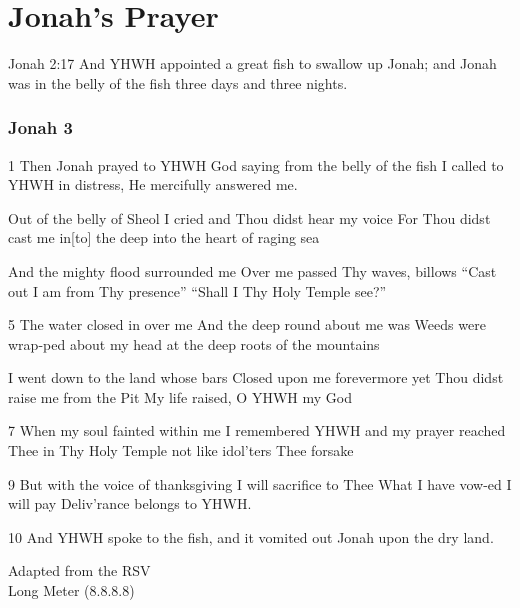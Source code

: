 \documentclass{article}
\begin{document}
\section*{Jonah's Prayer}

Jonah 2:17 And YHWH appointed a great fish to swallow up Jonah; and Jonah was in the belly of the fish three days and three nights.

\subsubsection*{Jonah 3}

1 Then Jonah prayed to YHWH God\newline
saying from the belly of the fish I called to YHWH in distress,\newline
He mercifully answered me.\newline

Out of the belly of Sheol\newline
I cried and Thou didst hear my voice For Thou didst cast me in[to] the deep\newline
into the heart of raging sea\newline

And the mighty flood surrounded me\newline
Over me passed Thy waves, billows  ``Cast out I am from Thy presence''\newline
``Shall I Thy Holy Temple see?''\newline

5 The water closed in over me\newline
And the deep round about me was\newline
Weeds were wrap-ped about my head at the deep roots of the mountains\newline

I went down to the land whose bars\newline
Closed upon me forevermore\newline
yet Thou didst raise me from the Pit\newline
My life raised, O YHWH my God\newline

7 When my soul fainted within me\newline
I remembered YHWH and my prayer\newline
reached Thee in Thy Holy Temple not like idol'ters Thee forsake\newline

9 But with the voice of thanksgiving\newline
I will sacrifice to Thee\newline
What I have vow-ed I will pay\newline
Deliv'rance belongs to YHWH.\newline

10 And YHWH spoke to the fish, and it vomited out Jonah upon the dry land.


Adapted from the RSV \\
Long Meter (8.8.8.8)
  
\end{document}
